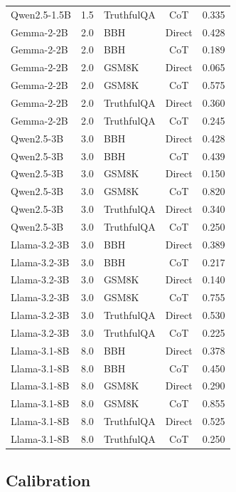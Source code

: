 \documentclass{article}
\begin{document}
\begin{longtable}{lclcr}
Qwen2.5-1.5B & 1.5 & TruthfulQA & CoT & 0.335 \\
Gemma-2-2B & 2.0 & BBH & Direct & 0.428 \\
Gemma-2-2B & 2.0 & BBH & CoT & 0.189 \\
Gemma-2-2B & 2.0 & GSM8K & Direct & 0.065 \\
Gemma-2-2B & 2.0 & GSM8K & CoT & 0.575 \\
Gemma-2-2B & 2.0 & TruthfulQA & Direct & 0.360 \\
Gemma-2-2B & 2.0 & TruthfulQA & CoT & 0.245 \\
Qwen2.5-3B & 3.0 & BBH & Direct & 0.428 \\
Qwen2.5-3B & 3.0 & BBH & CoT & 0.439 \\
Qwen2.5-3B & 3.0 & GSM8K & Direct & 0.150 \\
Qwen2.5-3B & 3.0 & GSM8K & CoT & 0.820 \\
Qwen2.5-3B & 3.0 & TruthfulQA & Direct & 0.340 \\
Qwen2.5-3B & 3.0 & TruthfulQA & CoT & 0.250 \\
Llama-3.2-3B & 3.0 & BBH & Direct & 0.389 \\
Llama-3.2-3B & 3.0 & BBH & CoT & 0.217 \\
Llama-3.2-3B & 3.0 & GSM8K & Direct & 0.140 \\
Llama-3.2-3B & 3.0 & GSM8K & CoT & 0.755 \\
Llama-3.2-3B & 3.0 & TruthfulQA & Direct & 0.530 \\
Llama-3.2-3B & 3.0 & TruthfulQA & CoT & 0.225 \\
Llama-3.1-8B & 8.0 & BBH & Direct & 0.378 \\
Llama-3.1-8B & 8.0 & BBH & CoT & 0.450 \\
Llama-3.1-8B & 8.0 & GSM8K & Direct & 0.290 \\
Llama-3.1-8B & 8.0 & GSM8K & CoT & 0.855 \\
Llama-3.1-8B & 8.0 & TruthfulQA & Direct & 0.525 \\
Llama-3.1-8B & 8.0 & TruthfulQA & CoT & 0.250 \\
\end{longtable}

\subsection{Calibration}
\end{document}
